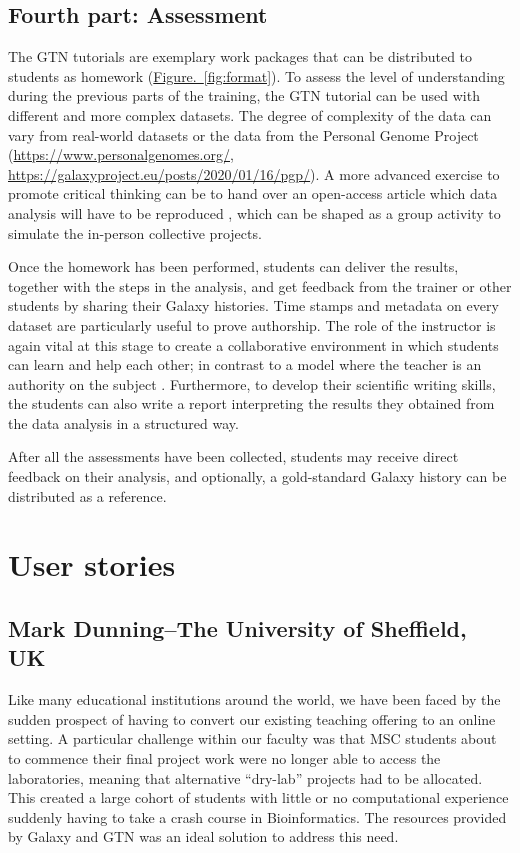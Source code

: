 \subsection*{Fourth part: Assessment}

The GTN tutorials are exemplary work packages that can be distributed to students as homework (\hyperref[fig:format]{Figure.~\ref{fig:format}}). To assess the level of understanding during the previous parts of the training, the GTN tutorial can be used with different and more complex datasets. The degree of complexity of the data can vary from real-world datasets or the data from the Personal Genome Project (\url{https://www.personalgenomes.org/}, \url{https://galaxyproject.eu/posts/2020/01/16/pgp/}). A more advanced exercise to promote critical thinking can be to hand over an open-access article which data analysis will have to be reproduced \cite{chakraborty2017learner}, which can be shaped as a group activity to simulate the in-person collective projects.

Once the homework has been performed, students can deliver the results, together with the steps in the analysis, and get feedback from the trainer or other students by sharing their Galaxy histories. Time stamps and metadata on every dataset are particularly useful to prove authorship. The role of the instructor is again vital at this stage to create a collaborative environment in which students can learn and help each other; in contrast to a model where the teacher is an authority on the subject \cite{mezirow1997transformative}. Furthermore, to develop their scientific writing skills, the students can also write a report interpreting the results they obtained from the data analysis in a structured way.

After all the assessments have been collected, students may receive direct feedback on their analysis, and optionally, a gold-standard Galaxy history can be distributed as a reference.

\section*{User stories}


\subsection*{Mark Dunning–The University of Sheffield, UK}


Like many educational institutions around the world, we have been faced by the sudden prospect of having to convert our existing teaching offering to an online setting. A particular challenge within our faculty was that MSC students about to commence their final project work were no longer able to access the laboratories, meaning that alternative ``dry-lab'' projects had to be allocated. This created a large cohort of students with little or no computational experience suddenly having to take a crash course in Bioinformatics. The resources provided by Galaxy and GTN was an ideal solution to address this need.

